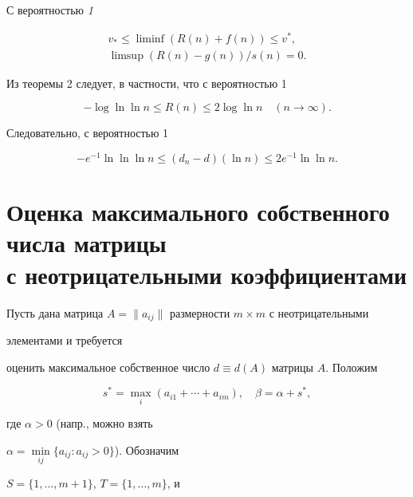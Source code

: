 \begin{thm} С вероятностью {\em 1} 


\begin{gather*} 


v_*\le \liminf (R(n)+f(n))\le v^*,\\ 


\limsup (R(n)-g(n))/s(n)=0. 


\end{gather*} 


\end{thm} 


 


Из теоремы 2 следует, в частности, что с вероятностью 1 


$$ 


-\log\ln\ln n\le R(n)\le 2\log\ln n\quad (n\to \infty). 


$$ 


Следовательно, с вероятностью 1 


\begin{equation} 


-e^{-1}\ln\ln\ln n\le (d_n-d)(\ln n)\le 2e^{-1}\ln\ln n. 


\end{equation} 


 


\section{Оценка максимального собственного числа матрицы \protect\\


с неотрицательными коэффициентами} 


 


Пусть дана матрица $A=\|a_{ij}\|$ размерности $m\times m$ с неотрицательными 


элементами и требуется 


оценить максимальное собственное число $d\equiv d(A)$ матрицы $A$. Положим 


$$ 


s^*=\max_i (a_{i1}+\dotsb+a_{im}),\quad \beta=\alpha+s^*, 


$$ 


где $\alpha>0$ (напр., можно взять 


$\alpha=\min\limits_{ij}\{a_{ij}:a_{ij}>0\}$). Обозначим 


$S=\{1,\dotsc,m+1\}$, $T=\{1,\dotsc,m\}$, и 


